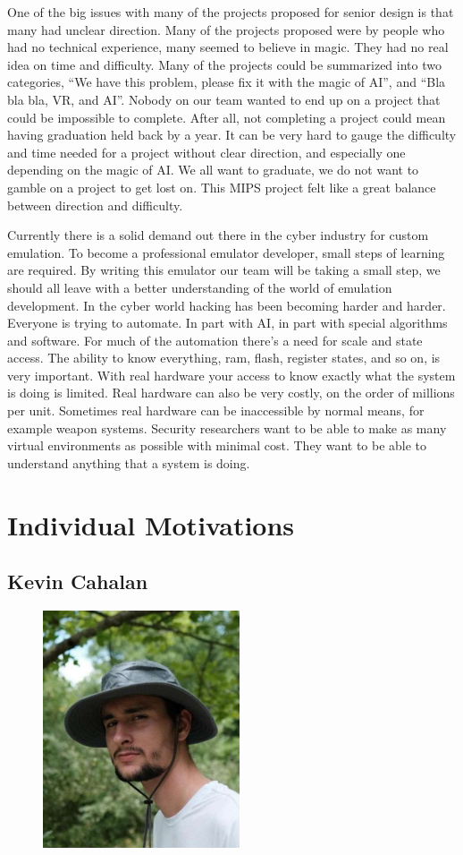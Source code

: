 \documentclass[
    paper=letter,
    parskip=half,
    fontsize=12pt,
    titlepage=firstiscover,
    toc=bibliography,
    numbers=endperiod
]{scrartcl}
\let\oldsection\section
\renewcommand{\section}{\newpage\oldsection}
\begin{document}
One of the big issues with many of the projects proposed for senior design is that many had unclear direction. Many of the projects proposed were by people who had no technical experience, many seemed to believe in magic. They had no real idea on time and difficulty. Many of the projects could be summarized into two categories, “We have this problem, please fix it with the magic of AI”, and “Bla bla bla, VR, and AI”. Nobody on our team wanted to end up on a project that could be impossible to complete. After all, not completing a project could mean having graduation held back by a year. It can be very hard to gauge the difficulty and time needed for a project without clear direction, and especially one depending on the magic of AI. We all want to graduate, we do not want to gamble on a project to get lost on. This MIPS project felt like a great balance between direction and difficulty.

Currently there is a solid demand out there in the cyber industry for custom emulation. To become a professional emulator developer, small steps of learning are required. By writing this emulator our team will be taking a small step, we should all leave with a better understanding of the world of emulation development. In the cyber world hacking has been becoming harder and harder. Everyone is trying to automate. In part with AI, in part with special algorithms and software. For much of the automation there's a need for scale and state access. The ability to know everything, ram, flash, register states, and so on, is very important. With real hardware your access to know exactly what the system is doing is limited. Real hardware can also be very costly, on the order of millions per unit. Sometimes real hardware can be inaccessible by normal means, for example weapon systems. Security researchers want to be able to make as many virtual environments as possible with minimal cost. They want to be able to understand anything that a system is doing.

\section{Individual Motivations}
\subsection{Kevin Cahalan}
\begin{figure}[H]
    \includegraphics[height=7cm]{profile-kevin}
\end{figure}
\end{document}
